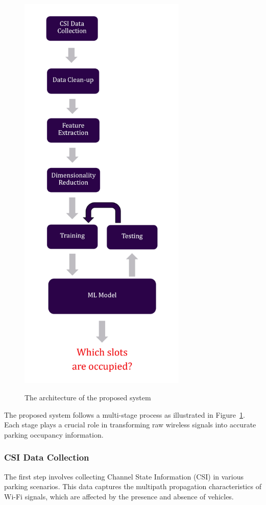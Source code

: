 \begin{figure}[H]
\begin{center}
\includegraphics[width=8cm]{Figures/system_design.png}\vspace{0mm}
\caption{The architecture of the proposed system}\vspace{0mm}
\label{fig:system_design}
\end{center}
\end{figure}

The proposed system follows a multi-stage process as illustrated in Figure~\ref{fig:system_design}. Each stage plays a crucial role in transforming raw wireless signals into accurate parking occupancy information.

\subsubsection{CSI Data Collection}
The first step involves collecting Channel State Information (CSI) in various parking scenarios. This data captures the multipath propagation characteristics of Wi-Fi signals, which are affected by the presence and absence of vehicles. 

